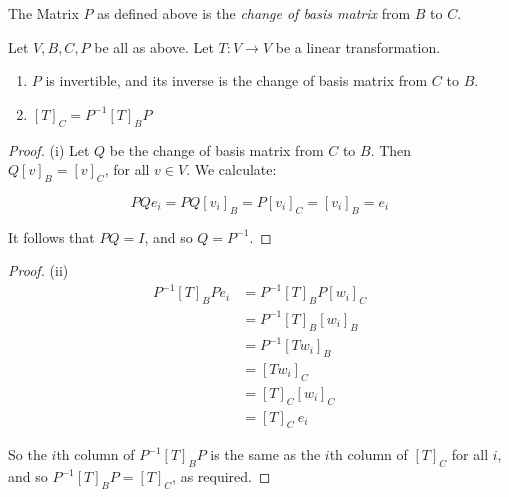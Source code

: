 \documentclass[twoside]{scrartcl}
\begin{document}
\begin{definition}The Matrix $P$ as defined above is the \emph{change of basis matrix} from $B$ to $C$.	
\end{definition}\vspace*{10pt}


\begin{proposition} Let $V, B, C, P$ be all as above. Let $T: V \to V$ be a linear transformation. 
\begin{enumerate}
\item[(i)] $P$ is invertible, and its inverse is the change of basis matrix from $C$ to $B$.
\item[(ii)] $[T]_C = P^{-1}[T]_BP$
\end{enumerate}
\end{proposition}

\begin{proof} (i)
Let $Q$ be the change of basis matrix from $C$ to $B$. Then $Q[v]_B = [v]_C$, for all $v \in V$. We calculate:

\[PQe_i = PQ[v_i]_B = P[v_i]_C = [v_i]_B = e_i\]

It follows that $PQ = I$, and so $Q = P^{-1}$.
\end{proof}

\begin{proof} (ii)
\[\begin{aligned}
P^{-1}[T]_BPe_i &= P^{-1}[T]_BP[w_i]_C\\
 &= P^{-1}[T]_B[w_i]_B\\
 &= P^{-1}[Tw_i]_B \\
 &=  [Tw_i]_C\\
 &= [T]_C[w_i]_C\\
 &= [T]_C~e_i
\end{aligned}
\]

So the $i$th column of $P^{-1}[T]_BP$ is the same as the $i$th column of $[T]_C$ for all $i$, and so $P^{-1}[T]_BP = [T]_C$, as required.
\end{proof} \vspace*{10pt}
\end{document}
